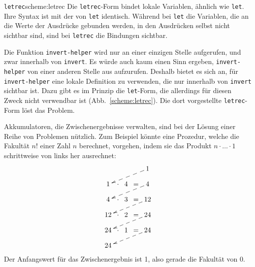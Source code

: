 \begin{feature}{\texttt{letrec}}{scheme:letrec}
Die \texttt{letrec}-Form bindet lokale Variablen, ähnlich wie \texttt{let}.
Ihre Syntax ist mit der von \texttt{let} identisch.  Während bei \texttt{let}
die Variablen, die an die Werte der Ausdrücke gebunden werden,
in den Ausdrücken selbst nicht sichtbar sind, sind bei \texttt{letrec}
die Bindungen sichtbar.  
\end{feature}

Die Funktion \texttt{invert-helper} wird nur an einer einzigen Stelle
aufgerufen, und zwar innerhalb von \texttt{invert}. Es würde auch kaum einen
Sinn ergeben, \texttt{invert-helper} von einer anderen Stelle aus
aufzurufen. Deshalb bietet es sich an, für \texttt{invert-helper} eine lokale
Definition zu verwenden, die nur innerhalb von \texttt{invert} sichtbar
ist. Dazu gibt es im Prinzip die \texttt{let}-Form, die allerdings für
diesen Zweck nicht verwendbar ist (Abb.~\ref{scheme:letrec}). Die dort
vorgestellte \texttt{letrec}-Form löst das Problem.

Akkumulatoren, die Zwischenergebnisse verwalten, sind bei der Lösung
einer Reihe von Problemen nützlich.  Zum Beispiel könnte eine
Prozedur, welche die Fakultät $n!$ einer Zahl $n$ berechnet,
vorgehen, indem sie das Produkt $n \cdot \ldots \cdot 1$ schrittweise von
links her ausrechnet:
%
\begin{displaymath}
  \xymatrix@R=10pt@C=2pt{
      &       &   & & 1\ar@{-->}[dllll]\\
    1 & \cdot & 4 &=& 4\ar@{-->}[dllll]\\
    4 & \cdot & 3 &=& 12\ar@{-->}[dllll]\\
    12 & \cdot & 2 &=& 24\ar@{-->}[dllll]\\
    24 & \cdot & 1 &=& 24\ar@{-->}[dllll]\\
    24
    }
\end{displaymath}
%
Der Anfangswert für das Zwischenergebnis ist 1, also gerade die
Fakultät von 0.

